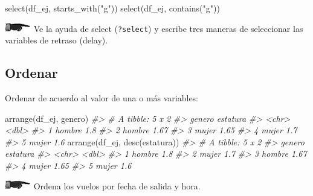 \documentclass[
]{book}
\newenvironment{Shaded}{\begin{snugshade}}{\end{snugshade}}
\newcommand{\CommentTok}[1]{\textcolor[rgb]{0.56,0.35,0.01}{\textit{#1}}}
\newcommand{\FunctionTok}[1]{\textcolor[rgb]{0.00,0.00,0.00}{#1}}
\newcommand{\NormalTok}[1]{#1}
\newcommand{\StringTok}[1]{\textcolor[rgb]{0.31,0.60,0.02}{#1}}
\begin{document}
\begin{Shaded}
\begin{Highlighting}[]
\FunctionTok{select}\NormalTok{(df\_ej, }\FunctionTok{starts\_with}\NormalTok{(}\StringTok{"g"}\NormalTok{))}
\FunctionTok{select}\NormalTok{(df\_ej, }\FunctionTok{contains}\NormalTok{(}\StringTok{"g"}\NormalTok{))}
\end{Highlighting}
\end{Shaded}

\includegraphics{imagenes/manicule2.jpg} Ve la ayuda de select (\texttt{?select}) y escribe tres
maneras de seleccionar las variables de retraso (delay).

\hypertarget{ordenar}{%
\subsection*{Ordenar}\label{ordenar}}

Ordenar de acuerdo al valor de una o más variables:

\begin{Shaded}
\begin{Highlighting}[]
\FunctionTok{arrange}\NormalTok{(df\_ej, genero)}
\CommentTok{\#\textgreater{} \# A tibble: 5 x 2}
\CommentTok{\#\textgreater{}   genero estatura}
\CommentTok{\#\textgreater{}   \textless{}chr\textgreater{}     \textless{}dbl\textgreater{}}
\CommentTok{\#\textgreater{} 1 hombre     1.8 }
\CommentTok{\#\textgreater{} 2 hombre     1.67}
\CommentTok{\#\textgreater{} 3 mujer      1.65}
\CommentTok{\#\textgreater{} 4 mujer      1.7 }
\CommentTok{\#\textgreater{} 5 mujer      1.6}
\FunctionTok{arrange}\NormalTok{(df\_ej, }\FunctionTok{desc}\NormalTok{(estatura))}
\CommentTok{\#\textgreater{} \# A tibble: 5 x 2}
\CommentTok{\#\textgreater{}   genero estatura}
\CommentTok{\#\textgreater{}   \textless{}chr\textgreater{}     \textless{}dbl\textgreater{}}
\CommentTok{\#\textgreater{} 1 hombre     1.8 }
\CommentTok{\#\textgreater{} 2 mujer      1.7 }
\CommentTok{\#\textgreater{} 3 hombre     1.67}
\CommentTok{\#\textgreater{} 4 mujer      1.65}
\CommentTok{\#\textgreater{} 5 mujer      1.6}
\end{Highlighting}
\end{Shaded}

\includegraphics{imagenes/manicule2.jpg} Ordena los vuelos por fecha de salida y hora.
\end{document}
